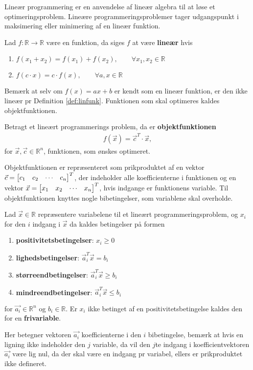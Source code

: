 Lineær programmering er en anvendelse af lineær algebra til at løse et optimeringsproblem. Lineære programmeringsproblemer tager udgangspunkt i maksimering eller minimering af en lineær funktion.
\begin{defn}
Lad $f:\mathds{R} \to \mathds{R}$ være en funktion, da siges $f$ at være \textbf{lineær} hvis
\begin{enumerate}[label=\alph*]
\item $f(x_1 + x_2) = f(x_1) + f(x_2), \qquad \forall x_1,x_2 \in \mathds{R}$
\item $f(c\cdot x) = c \cdot f(x), \qquad \forall a, x \in \mathds{R}$
\end{enumerate}
\label{def:linfunk}
\end{defn}
Bemærk at selv om $f(x) = ax + b$ er kendt som en lineær funktion, er den ikke lineær pr Definition \ref{def:linfunk}.
Funktionen som skal optimeres kaldes objektfunktionen.
\begin{defn}
Betragt et lineært programmerings problem, da er \textbf{objektfunktionen}
\begin{align*}
f(\vec{x}) = \vec{c}^T \cdot \vec{x}, 
\end{align*}
for $\vec{x}, \vec{c} \in \mathds{R}^n$, funktionen, som ønskes optimeret.
\end{defn}
Objektfunktionen er repræsenteret som prikproduktet af en vektor $\vec{c}= \begin{bmatrix} c_1 & c_2 & \cdots & c_n \end{bmatrix}^T$, der indeholder alle koefficienterne i funktionen og en vektor $\vec{x}= \begin{bmatrix} x_1 & x_2 & \cdots & x_n \end{bmatrix}^T$, hvis indgange er funktionens variable.
Til objektfunktionen knyttes nogle bibetingelser, som variablene skal overholde. 
\begin{defn}[bibetingelser]
Lad $\vec{x}\in \mathds{R}$ repræsentere variabelene til et lineært programmeringsproblem, og $x_i$ for den $i$ indgang i $\vec{x}$ da kaldes betingelser på formen
\begin{enumerate}
\item \textbf{positivitetsbetingelser}: $x_i \geq 0$
\item \textbf{lighedsbetingelser}: $\vec{a}_i^T\vec{x} = b_i$
\item \textbf{størreendbetingelser}: $\vec{a}_i^T\vec{x} \geq b_i$
\item \textbf{mindreendbetingelser}: $\vec{a}_i^T\vec{x} \leq b_i$
\end{enumerate}
for $\vec{a_i}\in \mathds{R}^n$ og $b_i\in \mathds{R}$. 
Er $x_i$ ikke betinget af en positivitetsbetingelse kaldes den for en \textbf{frivariable}.
\end{defn}
Her betegner vektoren $\vec{a_i}$ koefficienterne i den $i$ bibetingelse, bemærk at hvis en ligning ikke indeholder den $j$ variable, da vil den $j$te indgang i koefficientvektoren $\vec{a_i}$ være lig nul, da der skal være en indgang pr variabel, ellers er prikproduktet ikke defineret. 





